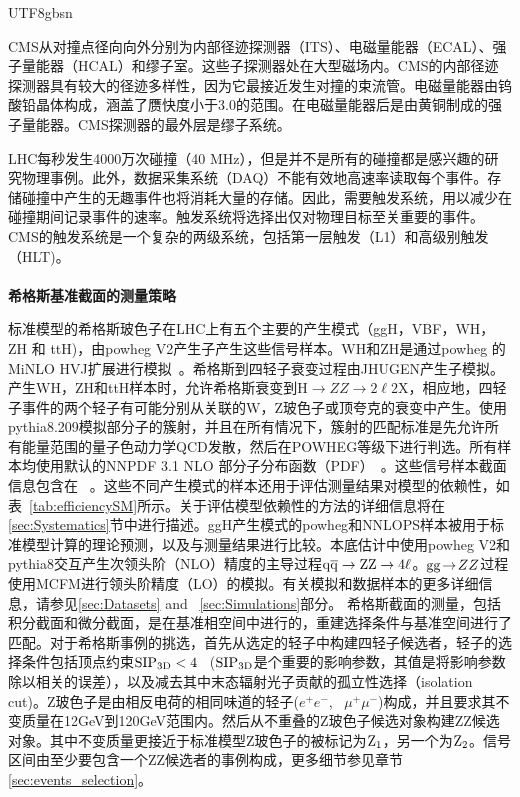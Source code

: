 \begin{CJK}{UTF8}{gbsn}
\par CMS从对撞点径向向外分别为内部径迹探测器（ITS）、电磁量能器（ECAL）、强子量能器（HCAL）和缪子室。这些子探测器处在大型磁场内。CMS的内部径迹探测器具有较大的径迹多样性，因为它最接近发生对撞的束流管。电磁量能器由钨酸铅晶体构成，涵盖了赝快度小于3.0的范围。在电磁量能器后是由黄铜制成的强子量能器。CMS探测器的最外层是缪子系统。
	\par LHC每秒发生4000万次碰撞（40 MHz），但是并不是所有的碰撞都是感兴趣的研究物理事例。此外，数据采集系统（DAQ）不能有效地高速率读取每个事件。存储碰撞中产生的无趣事件也将消耗大量的存储。因此，需要触发系统，用以减少在碰撞期间记录事件的速率。触发系统将选择出仅对物理目标至关重要的事件。CMS的触发系统是一个复杂的两级系统，包括第一层触发（L1）和高级别触发（HLT)。 \\ \\
\textbf{\large{希格斯基准截面的测量策略}} %
	\par 	标准模型的希格斯玻色子在LHC上有五个主要的产生模式（ggH，VBF，WH，ZH 和 ttH)，由{\sc powheg V2}产生子产生这些信号样本。WH和ZH是通过{\sc powheg} 的 {\sc MiNLO HVJ}扩展进行模拟~\cite{Luisoni:2013kna}。希格斯到四轻子衰变过程由{\sc JHUGEN}产生子模拟\cite{Gao:2010qx}。产生WH，ZH和ttH样本时，允许希格斯衰变到H$\to ZZ \to 2\ell2$X，相应地，四轻子事件的两个轻子有可能分别从关联的W，Z玻色子或顶夸克的衰变中产生。使用{\sc pythia8.209}模拟部分子的簇射，并且在所有情况下，簇射的匹配标准是先允许所有能量范围的量子色动力学QCD发散，然后在POWHEG等级下进行判选。所有样本均使用默认的NNPDF 3.1 NLO 部分子分布函数（PDF）~\cite{Ball:2014uwa}。这些信号样本截面信息包含在 ~\cite{CMS:2019chr}。这些不同产生模式的样本还用于评估测量结果对模型的依赖性，如表~\ref{tab:efficiencySM}所示。关于评估模型依赖性的方法的详细信息将在\ref{sec:Systematics}节中进行描述。ggH产生模式的{\sc powheg}和{\sc NNLOPS}样本被用于标准模型计算的理论预测，以及与测量结果进行比较。本底估计中使用{\sc powheg V2}和{\sc pythia8}交互产生次领头阶（NLO）精度的主导过程$\mathrm{q}\mathrm{\overline{q}} \rightarrow \mathrm{Z} \mathrm{Z} \rightarrow 4\ell$。$\mathrm{g}\mathrm{g} \! \rightarrow \! ZZ$过程使用{\sc MCFM}进行领头阶精度（LO）的模拟。有关模拟和数据样本的更多详细信息，请参见\ref{sec:Datasets} and ~\ref{sec:Simulations}部分。
希格斯截面的测量，包括积分截面和微分截面，是在基准相空间中进行的，重建选择条件与基准空间进行了匹配。对于希格斯事例的挑选，首先从选定的轻子中构建四轻子候选者，轻子的选择条件包括顶点约束${\rm SIP_{3D}} < 4$~ (${\rm SIP_{3D}}$是个重要的影响参数，其值是将影响参数除以相关的误差），以及减去其中末态辐射光子贡献的孤立性选择（isolation cut)。Z玻色子是由相反电荷的相同味道的轻子($e^+ e^-$, \, $\mu^+\mu^-$)构成，并且要求其不变质量在12GeV到120GeV范围内。然后从不重叠的Z玻色子候选对象构建ZZ候选对象。其中不变质量更接近于标准模型Z玻色子的被标记为${\rm Z_1}$，另一个为${\rm Z_2}$。信号区间由至少要包含一个ZZ候选者的事例构成，更多细节参见章节\ref{sec:events_selection}。

\end{CJK}
